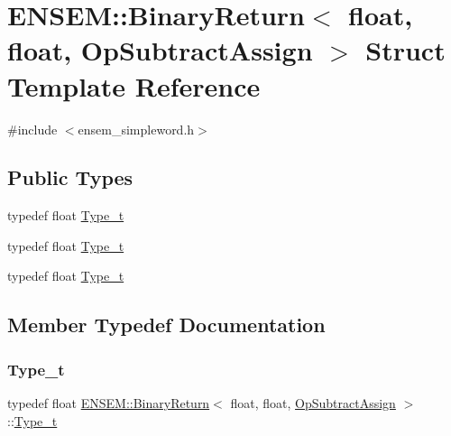 \hypertarget{structENSEM_1_1BinaryReturn_3_01float_00_01float_00_01OpSubtractAssign_01_4}{}\section{E\+N\+S\+EM\+:\+:Binary\+Return$<$ float, float, Op\+Subtract\+Assign $>$ Struct Template Reference}
\label{structENSEM_1_1BinaryReturn_3_01float_00_01float_00_01OpSubtractAssign_01_4}


{\ttfamily \#include $<$ensem\+\_\+simpleword.\+h$>$}

\subsection*{Public Types}
\begin{DoxyCompactItemize}
\item 
typedef float \mbox{\hyperlink{structENSEM_1_1BinaryReturn_3_01float_00_01float_00_01OpSubtractAssign_01_4_a0b38c0b93f84d57852605cf3a65412e8}{Type\+\_\+t}}
\item 
typedef float \mbox{\hyperlink{structENSEM_1_1BinaryReturn_3_01float_00_01float_00_01OpSubtractAssign_01_4_a0b38c0b93f84d57852605cf3a65412e8}{Type\+\_\+t}}
\item 
typedef float \mbox{\hyperlink{structENSEM_1_1BinaryReturn_3_01float_00_01float_00_01OpSubtractAssign_01_4_a0b38c0b93f84d57852605cf3a65412e8}{Type\+\_\+t}}
\end{DoxyCompactItemize}


\subsection{Member Typedef Documentation}
\mbox{\label{structENSEM_1_1BinaryReturn_3_01float_00_01float_00_01OpSubtractAssign_01_4_a0b38c0b93f84d57852605cf3a65412e8}} 
\subsubsection{\texorpdfstring{Type\_t}{Type\_t}\hspace{0.1cm}{\footnotesize\ttfamily [1/3]}}
{\footnotesize\ttfamily typedef float \mbox{\hyperlink{structENSEM_1_1BinaryReturn}{E\+N\+S\+E\+M\+::\+Binary\+Return}}$<$ float, float, \mbox{\hyperlink{structENSEM_1_1OpSubtractAssign}{Op\+Subtract\+Assign}} $>$\+::\mbox{\hyperlink{structENSEM_1_1BinaryReturn_3_01float_00_01float_00_01OpSubtractAssign_01_4_a0b38c0b93f84d57852605cf3a65412e8}{Type\+\_\+t}}}

